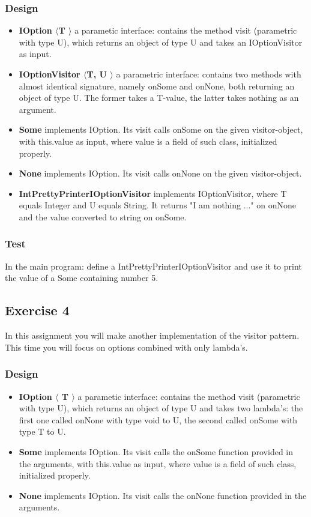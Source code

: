\subsubsection{Design}
\begin{itemize}
\item \textbf{IOption $\langle$T $\rangle$} a parametic interface: contains the method visit (parametric with type U), which returns an object of type U and takes an IOptionVisitor as input.
\item \textbf{IOptionVisitor $\langle$T, U $\rangle$} a parametric interface: contains two methods with almost identical signature, namely onSome and onNone, both returning an object of type U. The former takes a T-value, the latter takes nothing as an argument.
\item \textbf{Some} implements IOption. Its visit calls onSome on the given visitor-object, with this.value as input, where value is a field of such class, initialized properly.
\item \textbf{None} implements IOption. Its visit calls onNone on the given visitor-object.
\item \textbf{IntPrettyPrinterIOptionVisitor} implements IOptionVisitor, where T equals Integer and U equals String. It returns "I am nothing ..." on onNone and the value converted to string on onSome.
\end{itemize}

\subsubsection{Test}
In the main program: define a IntPrettyPrinterIOptionVisitor and use it to print the value of a Some containing number 5.


\subsection{Exercise 4}
In this assignment you will make another implementation of the visitor pattern.
This time you will focus on options combined with only lambda's.

\subsubsection{Design}
\begin{itemize}
\item \textbf{IOption $\langle$ T $\rangle$} a parametic interface: contains the method visit (parametric with type U), which returns an object of type U and takes two lambda's: the first one called onNone with type void to U, the second called onSome with type T to U.

\item \textbf{Some} implements IOption. Its visit calls the onSome function provided in the arguments, with this.value as input, where value is a field of such class, initialized properly.
\item \textbf{None} implements IOption. Its visit calls the onNone function provided in the arguments.
\end{itemize}

